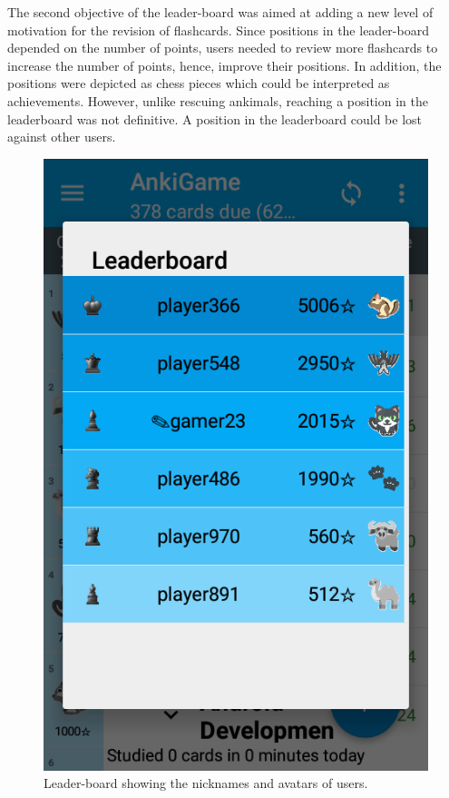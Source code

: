 The second objective of the leader-board was aimed at adding a new level of motivation for the revision of flashcards. Since positions in the leader-board depended on the number of points, users needed to review more flashcards to increase the number of points, hence, improve their positions. In addition, the positions were depicted as chess pieces which could be interpreted as achievements. However, unlike rescuing ankimals, reaching a position in the leaderboard was not definitive. A position in the leaderboard could be lost against other users.

\begin{figure}[htb]
    \vskip 5mm
        \begin{center}
            \includegraphics[scale=0.4]{./Figures/leaderboard.png}
            \caption{Leader-board showing the nicknames and avatars of users.}
            \label{fig:leaderboard}
        \end{center}
    \vskip -5mm
\end{figure}

